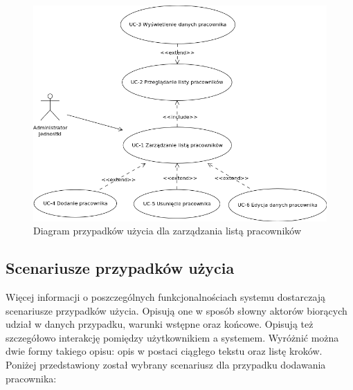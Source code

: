 \begin{figure}[tdh]
    \begin{center}
	\includegraphics[scale=.6]{img/diagram-uc.png}
	\caption{Diagram przypadków użycia dla zarządzania listą pracowników}
	\label{diagram-uc}
    \end{center}
\end{figure}


\subsection[Scenariusze przypadków użycia][Scenariusze przypadków użycia]{Scenariusze przypadków użycia}
Więcej informacji o poszczególnych funkcjonalnościach systemu dostarczają scenariusze przypadków użycia. Opisują one w sposób słowny aktorów biorących udział w danych przypadku, warunki wstępne oraz końcowe. Opisują też szczegółowo interakcję pomiędzy użytkownikiem a systemem. Wyróżnić można dwie formy takiego opisu: opis w postaci ciągłego tekstu oraz listę kroków. Poniżej przedstawiony został wybrany scenariusz dla przypadku dodawania pracownika:

